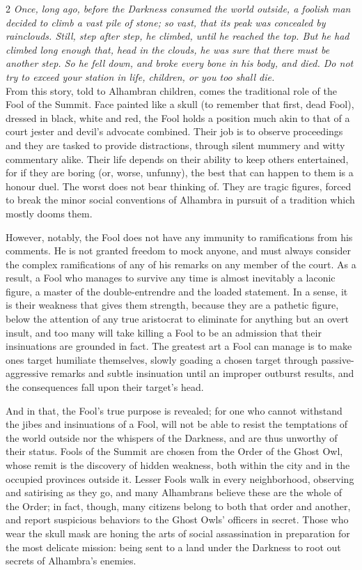 \begin{multicols}{2}
\noindent     \textit{ Once, long ago, before the Darkness consumed the world outside, a foolish man decided to climb a vast pile of stone; so vast, that its peak was concealed by rainclouds. Still, step after step, he climbed, until he reached the top. But he had climbed long enough that, head in the clouds, he was sure that there must be another step. So he fell down, and broke every bone in his body, and died. Do not try to exceed your station in life, children, or you too shall die. }\\

\noindent From this story, told to Alhambran children, comes the traditional role of the Fool of the Summit. Face painted like a skull (to remember that first, dead Fool), dressed in black, white and red, the Fool holds a position much akin to that of a court jester and devil's advocate combined. Their job is to observe proceedings and they are tasked to provide distractions, through silent mummery and witty commentary alike. Their life depends on their ability to keep others entertained, for if they are boring (or, worse, unfunny), the best that can happen to them is a honour duel. The worst does not bear thinking of. They are tragic figures, forced to break the minor social conventions of Alhambra in pursuit of a tradition which mostly dooms them.

However, notably, the Fool does not have any immunity to ramifications from his comments. He is not granted freedom to mock anyone, and must always consider the complex ramifications of any of his remarks on any member of the court. As a result, a Fool who manages to survive any time is almost inevitably a laconic figure, a master of the double-entrendre and the loaded statement. In a sense, it is their weakness that gives them strength, because they are a pathetic figure, below the attention of any true aristocrat to eliminate for anything but an overt insult, and too many will take killing a Fool to be an admission that their insinuations are grounded in fact. The greatest art a Fool can manage is to make ones target humiliate themselves, slowly goading a chosen target through passive-aggressive remarks and subtle insinuation until an improper outburst results, and the consequences fall upon their target's head.

And in that, the Fool's true purpose is revealed; for one who cannot withstand the jibes and insinuations of a Fool, will not be able to resist the temptations of the world outside nor the whispers of the Darkness, and are thus unworthy of their status. Fools of the Summit are chosen from the Order of the Ghost Owl, whose remit is the discovery of hidden weakness, both within the city and in the occupied provinces outside it. Lesser Fools walk in every neighborhood, observing and satirising as they go, and many Alhambrans believe these are the whole of the Order; in fact, though, many citizens belong to both that order and another, and report suspicious behaviors to the Ghost Owls' officers in secret. Those who wear the skull mask are honing the arts of social assassination in preparation for the most delicate mission: being sent to a land under the Darkness to root out secrets of Alhambra's enemies. 



\end{multicols}
